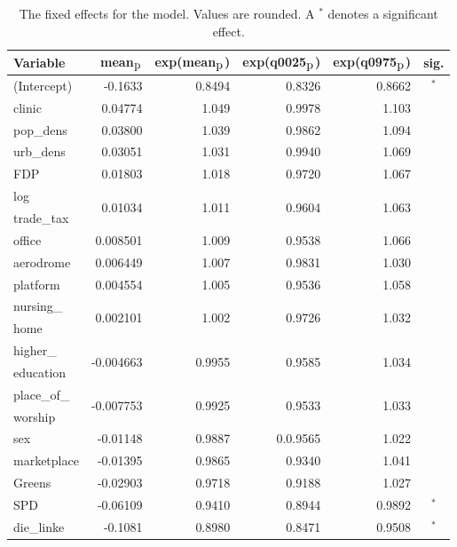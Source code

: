 \begin{table}[H]
\caption{The fixed effects for the model. Values are rounded. A $^*$ denotes a significant effect. \label{fixedAllGermany_temporal}}
\begin{tabular}{l r r r r c}
\toprule
\textbf{Variable}	& \textbf{mean$_{\hbox{p}}$}	& \textbf{exp(mean$_{\hbox{p}}$)} & \textbf{exp(q0025$_{\hbox{p}}$)} & \textbf{exp(q0975$_{\hbox{p}}$)} & \textbf{sig.}\\
\midrule
(Intercept) & -0.1633 & 0.8494 & 0.8326 & 0.8662 & $^*$\\
clinic & 0.04774 & 1.049 & 0.9978 & 1.103 \\
pop\_dens & 0.03800 & 1.039 & 0.9862 & 1.094 \\
urb\_dens & 0.03051 & 1.031 & 0.9940 & 1.069 \\
FDP & 0.01803 & 1.018 & 0.9720 & 1.067 \\
log & \multirow{2}{*}{0.01034} & \multirow{2}{*}{1.011} & \multirow{2}{*}{0.9604} & \multirow{2}{*}{1.063} & \multirow{2}{*}{}\\
trade\_tax \\
office & 0.008501 & 1.009 & 0.9538 & 1.066 \\
aerodrome & 0.006449 & 1.007 & 0.9831 & 1.030 \\
platform & 0.004554 & 1.005 & 0.9536 & 1.058 \\
nursing\_ & \multirow{2}{*}{0.002101} & \multirow{2}{*}{1.002} & \multirow{2}{*}{0.9726} & \multirow{2}{*}{1.032} \\
home\\
higher\_ & \multirow{2}{*}{-0.004663} & \multirow{2}{*}{0.9955} & \multirow{2}{*}{0.9585} & \multirow{2}{*}{1.034} \\
education\\
place\_of\_ & \multirow{2}{*}{-0.007753} & \multirow{2}{*}{0.9925} & \multirow{2}{*}{0.9533} & \multirow{2}{*}{1.033} \\
worship\\
sex & -0.01148 & 0.9887 & 0.0.9565 & 1.022 \\
marketplace & -0.01395 & 0.9865 & 0.9340 & 1.041 \\
Greens & -0.02903 & 0.9718 & 0.9188 & 1.027\\
SPD & -0.06109 & 0.9410 & 0.8944 & 0.9892 & $^*$ \\
die\_linke & -0.1081 & 0.8980 & 0.8471 & 0.9508& $^*$ \\
\bottomrule
\end{tabular}
\end{table}
